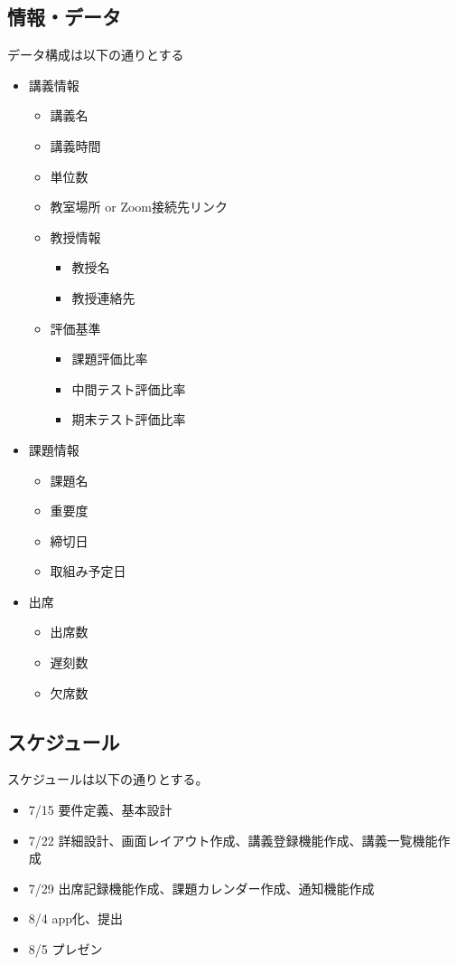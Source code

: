 \documentclass[a4paper, 11pt, titlepage]{jsarticle}
\begin{document}
\subsection{情報・データ}
データ構成は以下の通りとする
\begin{itemize}
\item 講義情報
\begin{itemize}
  \item 講義名
  \item 講義時間
  \item 単位数
  \item 教室場所 or Zoom接続先リンク
  \item 教授情報
  \begin{itemize}
    \item 教授名
    \item 教授連絡先
  \end{itemize}
  \item 評価基準
  \begin{itemize}
    \item 課題評価比率
    \item 中間テスト評価比率
    \item 期末テスト評価比率
  \end{itemize}
\end{itemize}
\item 課題情報
\begin{itemize}
  \item 課題名
  \item 重要度
  \item 締切日
  \item 取組み予定日
\end{itemize}
\item 出席
\begin{itemize}
\item 出席数
\item 遅刻数
\item 欠席数
\end{itemize}
\end{itemize}


\subsection{スケジュール}
スケジュールは以下の通りとする。
\begin{itemize}
\item 7/15 要件定義、基本設計
\item 7/22 詳細設計、画面レイアウト作成、講義登録機能作成、講義一覧機能作成
\item 7/29 出席記録機能作成、課題カレンダー作成、通知機能作成
\item 8/4 app化、提出
\item 8/5 プレゼン
\end{itemize}
\end{document}
